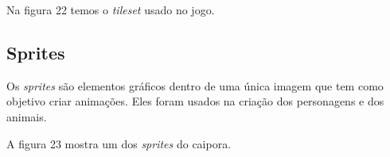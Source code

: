 Na figura 22 temos o \textit{tileset} usado no jogo.
\begin{figure}[h!]
		\centering
	\end{figure}

\subsection{Sprites}
Os \textit{sprites} são elementos gráficos dentro de uma única imagem que tem como objetivo criar animações. Eles foram usados na criação dos personagens e dos animais. 

A figura 23 mostra um dos \textit{sprites} do caipora.

\begin{figure}[h!]
		\centering
	\end{figure}


